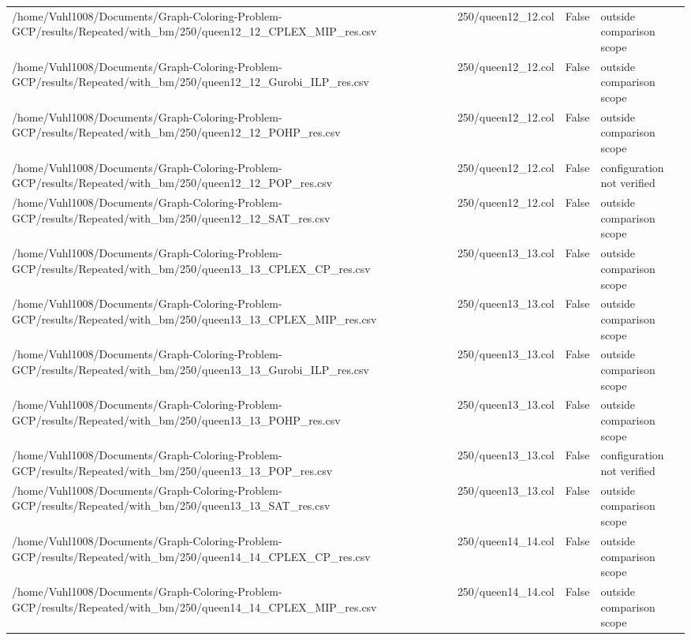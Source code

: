 \begin{table}[htbp]
\begin{tabular}{llll}
/home/Vuhl1008/Documents/Graph-Coloring-Problem-GCP/results/Repeated/with\_bm/250/queen12\_12\_CPLEX\_MIP\_res.csv & 250/queen12\_12.col & False & outside comparison scope \\
/home/Vuhl1008/Documents/Graph-Coloring-Problem-GCP/results/Repeated/with\_bm/250/queen12\_12\_Gurobi\_ILP\_res.csv & 250/queen12\_12.col & False & outside comparison scope \\
/home/Vuhl1008/Documents/Graph-Coloring-Problem-GCP/results/Repeated/with\_bm/250/queen12\_12\_POHP\_res.csv & 250/queen12\_12.col & False & outside comparison scope \\
/home/Vuhl1008/Documents/Graph-Coloring-Problem-GCP/results/Repeated/with\_bm/250/queen12\_12\_POP\_res.csv & 250/queen12\_12.col & False & configuration not verified \\
/home/Vuhl1008/Documents/Graph-Coloring-Problem-GCP/results/Repeated/with\_bm/250/queen12\_12\_SAT\_res.csv & 250/queen12\_12.col & False & outside comparison scope \\
/home/Vuhl1008/Documents/Graph-Coloring-Problem-GCP/results/Repeated/with\_bm/250/queen13\_13\_CPLEX\_CP\_res.csv & 250/queen13\_13.col & False & outside comparison scope \\
/home/Vuhl1008/Documents/Graph-Coloring-Problem-GCP/results/Repeated/with\_bm/250/queen13\_13\_CPLEX\_MIP\_res.csv & 250/queen13\_13.col & False & outside comparison scope \\
/home/Vuhl1008/Documents/Graph-Coloring-Problem-GCP/results/Repeated/with\_bm/250/queen13\_13\_Gurobi\_ILP\_res.csv & 250/queen13\_13.col & False & outside comparison scope \\
/home/Vuhl1008/Documents/Graph-Coloring-Problem-GCP/results/Repeated/with\_bm/250/queen13\_13\_POHP\_res.csv & 250/queen13\_13.col & False & outside comparison scope \\
/home/Vuhl1008/Documents/Graph-Coloring-Problem-GCP/results/Repeated/with\_bm/250/queen13\_13\_POP\_res.csv & 250/queen13\_13.col & False & configuration not verified \\
/home/Vuhl1008/Documents/Graph-Coloring-Problem-GCP/results/Repeated/with\_bm/250/queen13\_13\_SAT\_res.csv & 250/queen13\_13.col & False & outside comparison scope \\
/home/Vuhl1008/Documents/Graph-Coloring-Problem-GCP/results/Repeated/with\_bm/250/queen14\_14\_CPLEX\_CP\_res.csv & 250/queen14\_14.col & False & outside comparison scope \\
/home/Vuhl1008/Documents/Graph-Coloring-Problem-GCP/results/Repeated/with\_bm/250/queen14\_14\_CPLEX\_MIP\_res.csv & 250/queen14\_14.col & False & outside comparison scope \\

\end{tabular}
\end{table}

